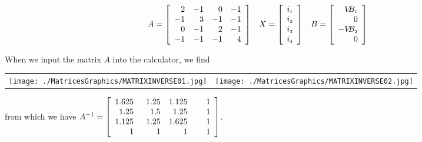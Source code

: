 \begin{ex}
\begin{enumerate}
\[ \begin{array}{ccc} 

A = \left[ \begin{array}{rrrr} 2 & -1 & 0 & -1  \\ -1 & 3 & -1 & -1 \\ 0 & -1 & 2 & -1 \\ -1 & -1 & -1 & 4 \end{array} \right] 

&

 X = \left[ \begin{array}{r} i_{\mbox{\tiny$1$}} \\ i_{\mbox{\tiny$2$}} \\ i_{\mbox{\tiny$3$}} \\ i_{\mbox{\tiny$4$}} \\ \end{array} \right]
 
&

 B = \left[ \begin{array}{r} V\!\!B_{\mbox{\tiny$1$}} \\ 0 \\ -V\!\!B_{\mbox{\tiny$2$}} \\ 0 \end{array} \right] 
 \end{array}\]   

When we input the matrix $A$ into the calculator, we find

\begin{center}

\begin{tabular}{cc}

\texttt{[image: ./MatricesGraphics/MATRIXINVERSE01.jpg]} &

\hspace{0.75in} \texttt{[image: ./MatricesGraphics/MATRIXINVERSE02.jpg]}  \\

\end{tabular}

\end{center}

from which we have  $A^{-1} = \left[ \begin{array}{rrrr} 1.625 & \hphantom{2}1.25 & 1.125 & \hphantom{2.2}1  \\ 1.25 & 1.5 & 1.25 & 1 \\ 1.125 & 1.25 & 1.625 & 1 \\ 1 & 1 & 1 & 1 \end{array} \right]$. 


\end{enumerate}
\end{ex}
